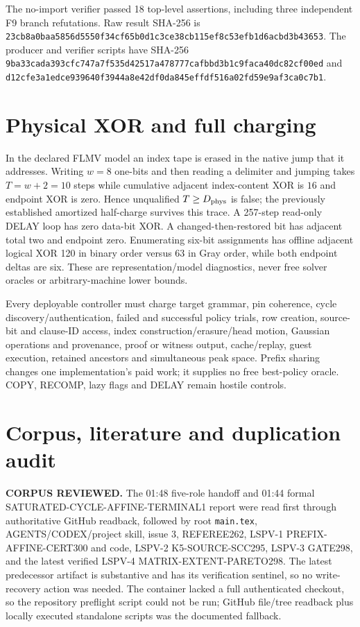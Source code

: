 \documentclass[11pt]{article}
\begin{document}
The no-import verifier passed 18 top-level assertions, including three
independent F9 branch refutations. Raw result SHA-256 is
\texttt{23cb8a0baa5856d5550f34cf65b0d1c3ce38cb115ef8c53efb1d6acbd3b43653}.
The producer and verifier scripts have SHA-256
\texttt{9ba33cada393cfc747a7f535d42517a478777cafbbd3b1c9faca40dc82cf00ed}
and
\texttt{d12cfe3a1edce939640f3944a8e42df0da845effdf516a02fd59e9af3ca0c7b1}.

\section{Physical XOR and full charging}
In the declared FLMV model an index tape is erased in the native jump that it
addresses. Writing $w=8$ one-bits and then reading a delimiter and jumping
takes $T=w+2=10$ steps while cumulative adjacent index-content XOR is $16$
and endpoint XOR is zero. Hence unqualified $T\ge D_{\rm phys}$ is false;
the previously established amortized half-charge survives this trace.
A 257-step read-only DELAY loop has zero data-bit XOR. A changed-then-restored
bit has adjacent total two and endpoint zero. Enumerating six-bit assignments
has offline adjacent logical XOR 120 in binary order versus 63 in Gray order,
while both endpoint deltas are six. These are representation/model
diagnostics, never free solver oracles or arbitrary-machine lower bounds.

Every deployable controller must charge target grammar, pin coherence, cycle
discovery/authentication, failed and successful policy trials, row creation,
source-bit and clause-ID access, index construction/erasure/head motion,
Gaussian operations and provenance, proof or witness output, cache/replay,
guest execution, retained ancestors and simultaneous peak space. Prefix
sharing changes one implementation's paid work; it supplies no free best-policy
oracle. COPY, RECOMP, lazy flags and DELAY remain hostile controls.

\section{Corpus, literature and duplication audit}
\textbf{CORPUS REVIEWED.} The 01:48 five-role handoff and 01:44 formal
SATURATED-CYCLE-AFFINE-TERMINAL1 report were read first through authoritative
GitHub readback, followed by root \texttt{main.tex}, AGENTS/CODEX/project skill,
issue 3, REFEREE262, LSPV-1 PREFIX-AFFINE-CERT300 and code, LSPV-2
K5-SOURCE-SCC295, LSPV-3 GATE298, and the latest verified LSPV-4
MATRIX-EXTENT-PARETO298. The latest predecessor artifact is substantive and
has its verification sentinel, so no write-recovery action was needed. The
container lacked a full authenticated checkout, so the repository preflight
script could not be run; GitHub file/tree readback plus locally executed
standalone scripts was the documented fallback.
\end{document}
